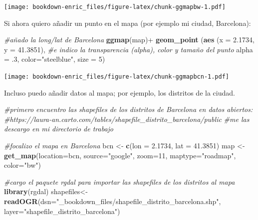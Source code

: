 \documentclass[]{book}
\newenvironment{Shaded}{\begin{snugshade}}{\end{snugshade}}
\newcommand{\KeywordTok}[1]{\textcolor[rgb]{0.13,0.29,0.53}{\textbf{{#1}}}}
\newcommand{\DataTypeTok}[1]{\textcolor[rgb]{0.13,0.29,0.53}{{#1}}}
\newcommand{\DecValTok}[1]{\textcolor[rgb]{0.00,0.00,0.81}{{#1}}}
\newcommand{\FloatTok}[1]{\textcolor[rgb]{0.00,0.00,0.81}{{#1}}}
\newcommand{\StringTok}[1]{\textcolor[rgb]{0.31,0.60,0.02}{{#1}}}
\newcommand{\CommentTok}[1]{\textcolor[rgb]{0.56,0.35,0.01}{\textit{{#1}}}}
\newcommand{\NormalTok}[1]{{#1}}
\theoremstyle{definition}
\theoremstyle{definition}
\theoremstyle{remark}
\begin{document}
\texttt{[image: bookdown-enric\_files/figure-latex/chunk-ggmapbw-1.pdf]}

Si ahora quiero añadir un punto en el mapa (por ejemplo mi ciudad,
Barcelona):

\begin{Shaded}
\begin{Highlighting}[]
\CommentTok{#añado la long/lat de Barcelona}
\KeywordTok{ggmap}\NormalTok{(map)+}\StringTok{ }\KeywordTok{geom_point} \NormalTok{(}\KeywordTok{aes} \NormalTok{(}\DataTypeTok{x =} \FloatTok{2.1734}\NormalTok{, }\DataTypeTok{y =} \FloatTok{41.3851}\NormalTok{),  }
\CommentTok{#e indico la transparencia (alpha), color y tamaño del punto}
\DataTypeTok{alpha =} \NormalTok{.}\DecValTok{3}\NormalTok{, }\DataTypeTok{color=}\StringTok{"steelblue"}\NormalTok{, }\DataTypeTok{size =} \DecValTok{5}\NormalTok{)}
\end{Highlighting}
\end{Shaded}

\texttt{[image: bookdown-enric\_files/figure-latex/chunk-ggmapbcn-1.pdf]}

Incluso puedo añadir datos al mapa; por ejemplo, los distritos de la
ciudad.

\begin{Shaded}
\begin{Highlighting}[]
\CommentTok{#primero encuentro las shapefiles de los distritos de Barcelona en datos abiertos:}
\CommentTok{#https://laura-an.carto.com/tables/shapefile_distrito_barcelona/public}
\CommentTok{#me las descargo en mi directorio de trabajo}

\CommentTok{#focalizo el mapa en Barcelona}
\NormalTok{bcn <-}\StringTok{ }\KeywordTok{c}\NormalTok{(}\DataTypeTok{lon =} \FloatTok{2.1734}\NormalTok{, }\DataTypeTok{lat =} \FloatTok{41.3851}\NormalTok{)}
\NormalTok{map <-}\StringTok{ }\KeywordTok{get_map}\NormalTok{(}\DataTypeTok{location=}\NormalTok{bcn, }\DataTypeTok{source=}\StringTok{"google"}\NormalTok{, }\DataTypeTok{zoom=}\DecValTok{11}\NormalTok{, }\DataTypeTok{maptype=}\StringTok{"roadmap"}\NormalTok{, }\DataTypeTok{color=}\StringTok{"bw"}\NormalTok{)}

\CommentTok{#cargo el paquete rgdal para importar las shapefiles de los distritos al mapa}
\KeywordTok{library}\NormalTok{(rgdal)}
\NormalTok{shapefiles<-}\KeywordTok{readOGR}\NormalTok{(}\DataTypeTok{dsn=}\StringTok{"_bookdown_files/shapefile_distrito_barcelona.shp"}\NormalTok{,}
                    \DataTypeTok{layer=}\StringTok{"shapefile_distrito_barcelona"}\NormalTok{) }
\end{Highlighting}
\end{Shaded}
\end{document}
